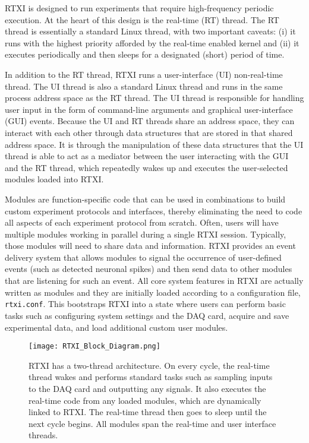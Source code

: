 RTXI is designed to run experiments that require high-frequency periodic execution. At the heart of this design is the real-time (RT) thread. The RT thread is essentially a standard Linux thread, with two important caveats: (i) it runs with the highest priority afforded by the real-time enabled kernel and (ii) it executes periodically and then sleeps for a designated (short) period of time.

In addition to the RT thread, RTXI runs a user-interface (UI) non-real-time thread. The UI thread is also a standard Linux thread and runs in the same process address space as the RT thread. The UI thread is responsible for handling user input in the form of command-line arguments and graphical user-interface (GUI) events. Because the UI and RT threads share an address space, they can interact with each other through data structures that are stored in that shared address space. It is through the manipulation of these data structures that the UI thread is able to act as a mediator between the user interacting with the GUI and the RT thread, which repeatedly wakes up and executes the user-selected modules loaded into RTXI. 

Modules are function-specific code that can be used in combinations to build custom experiment protocols and interfaces, thereby eliminating the need to code all aspects of each experiment protocol from scratch. Often, users will have multiple modules working in parallel during a single RTXI session. Typically, those modules will need to share data and information. RTXI provides an event delivery system that allows modules to signal the occurrence of user-defined events (such as detected neuronal spikes) and then send data to other modules that are listening for such an event. All core system features in RTXI are actually written as modules and they are initially loaded according to a configuration file, \texttt{rtxi.conf}. This bootstraps RTXI into a state where users can perform basic tasks such as configuring system settings and the DAQ card, acquire and save experimental data, and load additional custom user modules.

\begin{figure}[h]
\begin{maxipage}
\begin{center}
\texttt{[image: RTXI\_Block\_Diagram.png]} 
\caption[RTXI Architecture]{RTXI has a two-thread architecture. On every cycle, the real-time thread wakes and performs standard tasks such as sampling inputs to the DAQ card and outputting any signals. It also executes the real-time code from any loaded modules, which are dynamically linked to RTXI. The real-time thread then goes to sleep until the next cycle begins. All modules span the real-time and user interface threads.} 
\end{center}
\end{maxipage}
\end{figure}


